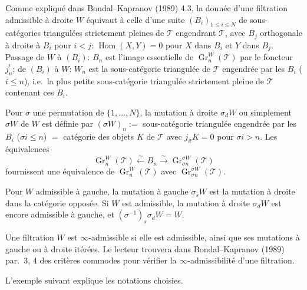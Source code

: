 \documentclass[11pt,a4paper]{article}
\theoremstyle{plain}
\theoremstyle{definition}
\DeclareMathOperator{\Hom}{Hom}
\DeclareMathOperator{\Gr}{Gr}
\newcommand{\cT}{\mathscr{T}}
\begin{document}
Comme expliqu\'e dans Bondal--Kapranov (1989) 4.3, la donn\'ee d'une filtration admissible \`a droite $W$ \'equivaut \`a celle d'une suite $(B_i)_{1 \leq i \leq N}$ de sous-cat\'egories triangul\'ees strictement pleines de $\cT$ engendrant $\cT$, avec $B_j$ orthogonale \`a droite \`a $B_i$ pour $i < j$: $\Hom(X,Y) = 0$ pour $X$ dans $B_i$ et $Y$ dans $B_j$. Passage de $W$ \`a $(B_i)$: $B_n$ est l'image essentielle de $\Gr_n^W(\cT)$ par le foncteur $j_n^!$; de $(B_i)$ \`a $W$: $W_n$ est la sous-cat\'egorie triangul\'ee de $\cT$ engendr\'ee par les $B_i$ ($i \leq n$), i.e.\ la plus petite sous-cat\'egorie triangul\'ee strictement pleine de $\cT$ contenant ces $B_i$.

Pour $\sigma$ une permutation de $\{1,\ldots,N\}$, la mutation \`a droite $\sigma_d W$ ou simplement $\sigma W$ de $W$ est d\'efinie par $(\sigma W)_n :=$ sous-cat\'egorie triangul\'ee engendr\'ee par les $B_i$ ($\sigma i \leq n$) $=$ cat\'egorie des objets $K$ de $\cT$ avec $j_{i!} K = 0$ pour $\sigma i > n$. Les \'equivalences
\begin{equation}\label{eq:0.2}
\Gr_n^W(\cT) \xleftarrow{\;\sim\;} B_n \xrightarrow{\;\sim\;} \Gr_{\sigma n}^{\sigma W}(\cT)
\tag{0.2}
\end{equation}
fournissent une \'equivalence de $\Gr_n^W(\cT)$ avec $\Gr_{\sigma n}^{\sigma W}(\cT)$.

Pour $W$ admissible \`a gauche, la mutation \`a gauche $\sigma_s W$ est la mutation \`a droite dans la cat\'egorie oppos\'ee. Si $W$ est admissible, la mutation \`a droite $\sigma_d W$ est encore admissible \`a gauche, et $(\sigma^{-1})_s \sigma_d W = W$.

Une filtration $W$ est $\infty$-admissible si elle est admissible, ainsi que ses mutations \`a gauche ou \`a droite it\'er\'ees. Le lecteur trouvera dans Bondal--Kapranov (1989) par.~3, 4 des crit\`eres commodes pour v\'erifier la $\infty$-admissibilit\'e d'une filtration.

L'exemple suivant explique les notations choisies.
\end{document}
